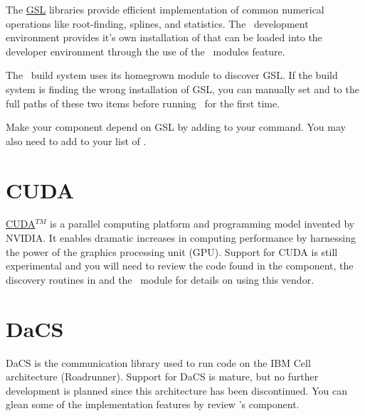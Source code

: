The \href{http://www.gnu.org/software/gsl/}{GSL} libraries provide efficient implementation of common numerical operations like root-finding, splines, and statistics. The \draco\ development environment provides it's own installation of  that can be loaded into the developer environment through the use of the \draco\ modules feature.

The \draco\ build system uses its homegrown  module to discover GSL.  If the build system is finding the wrong installation of GSL, you can manually set  and  to the full paths of these two items before running \cmake\ for the first time.

Make your component depend on GSL by adding  to your  command.  You may also need to add  to your list of .


\section{CUDA}
\label{appsec:cuda} 

\href{http://www.nvidia.com/object/cuda_home_new.html}{CUDA}$^{TM}$ is a parallel computing platform and programming model invented by NVIDIA. It enables dramatic increases in computing performance by harnessing the power of the graphics processing unit (GPU).  Support for CUDA is still experimental and you will need to review the code found in the  component, the discovery routines in  and the \cmake\ module  for details on using this vendor.


\section{DaCS}
\label{appsec:dacs} 

DaCS is the communication library used to run code on the IBM Cell architecture (Roadrunner).  Support for DaCS is mature, but no further development is planned since this architecture has been discontinued.  You can glean some of the implementation features by review \draco's  component.


